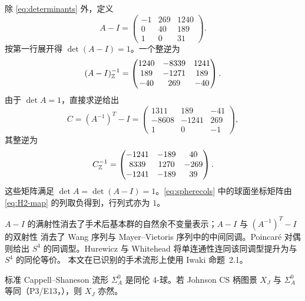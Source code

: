 除 \eqref{eq:determinants} 外，定义
\begin{equation}\label{eq:A-minus-I}
A-I=
\begin{pmatrix}
-1&269&1240\\
0&40&189\\
1&0&31
\end{pmatrix}.
\end{equation}
按第一行展开得 $\det(A-I)=1$。一个整逆为
\begin{equation}\label{eq:B-inverse}
(A-I)^{-1}_{\mathbb{Z}}=
\begin{pmatrix}
1240&-8339&1241\\
189&-1271&189\\
-40&269&-40
\end{pmatrix}.
\end{equation}
由于 $\det A=1$，直接求逆给出
\begin{equation}\label{eq:H2-map}
C=(A^{-1})^T-I=
\begin{pmatrix}
1311&189&-41\\
-8608&-1241&269\\
1&0&-1
\end{pmatrix},
\end{equation}
其整逆为
\begin{equation}\label{eq:H2-inverse}
C^{-1}_{\mathbb{Z}}=
\begin{pmatrix}
-1241&-189&40\\
8339&1270&-269\\
-1241&-189&39
\end{pmatrix}.
\end{equation}
这些矩阵满足 $\det A=\det(A-I)=1$。\eqref{eq:spherecols} 中的球面坐标矩阵由
\eqref{eq:H2-map} 的列取负得到，行列式亦为 $1$。

\begin{remark}[长拓扑路线]\label{rem:long-topology-route}
$A-I$ 的满射性消去了手术后基本群的自然余不变量表示；$A-I$ 与 $(A^{-1})^T-I$ 的双射性
消去了 Wang 序列与 Mayer--Vietoris 序列中的中间同调。Poincar\'e 对偶则给出 $S^4$
的同调型。Hurewicz 与 Whitehead 将单连通性连同该同调型提升为与 $S^4$ 的同伦等价。
本文在已识别的手术流形上使用 Iwaki
命题~2.1。
\end{remark}

\begin{corollary}[同伦球结论]
\label{cor:homotopy-sphere}
标准 Cappell--Shaneson 流形 $\Sigma_A^0$ 是同伦 $4$-球。若 Johnson CS 柄图景 $X_J$ 与 $\Sigma_A^0$ 等同（P3/E13，\Open），则 $X_J$ 亦然。
\end{corollary}

